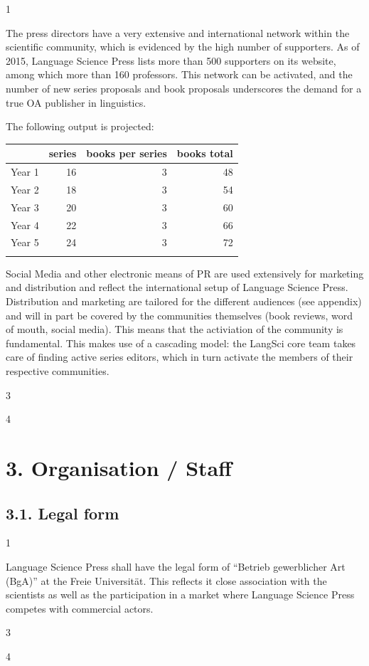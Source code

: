\documentclass[output=guidelines,draftmode]{langscibook}
\newcommand{\background}[1]{ 
  \vspace{5mm}
  \renewcommand{\tblslinecolour}{lsDarkBlue}
  \tblssy[red]{explore2}{Background}{#1}
}
\newcommand{\langscisolution}[1]{
  \renewcommand{\tblslinecolour}{lsLightBlue}
  \tblssy{langsci}{LangSci solution}{#1}
}
\newcommand{\evaluation}[1]{
  \renewcommand{\tblslinecolour}{lsLightOrange}
  \tblssy{receipt}{Evaluation}{#1}
}
\newcommand{\othersolutions}[1]{
  \renewcommand{\tblslinecolour}{lsDarkGreenOne}
  \tblssy{more}{Other solutions}{#1}
}
\renewcommand{\tblssy}[4][black!12]{%
  \renewcommand{\langscisymbol}{#2}\renewcommand{\tblsboxcolor}{#1}
  \begin{mdframed}[style=yellowexercise,frametitle={#3}]
    #4
  \end{mdframed}
}
\begin{document}
\background{1}
\langscisolution{
The press directors have a very extensive and international network within the scientific community, which is evidenced by the high number of supporters. As of 2015, Language Science Press lists more than 500 supporters on its website, among which more than 160 professors. This network can be activated, and the number of new series proposals and book proposals underscores the demand for a true OA publisher in linguistics. 

The following output is projected:

\noindent
\begin{tabularx}{\textwidth}{Xrrr}
\lsptoprule
        & series &  books per series & books total   \\
\midrule         
Year 1 & 16      &  3                & 48              \\
Year 2 & 18      &  3                & 54              \\
Year 3 & 20      &  3                & 60              \\
Year 4 & 22      &  3                & 66              \\
Year 5 & 24      &  3                & 72              \\
\lspbottomrule
\end{tabularx}

Social Media and other electronic means of PR are used extensively for marketing and distribution and reflect the international setup of Language Science Press. Distribution and marketing are tailored for the different audiences (see appendix) and will in part be covered by the communities themselves (book reviews, word of mouth, social media). This means that the activiation of the community is fundamental. This makes use of a cascading model: the LangSci core team takes care of finding active series editors, which in turn activate the members of their respective communities.  
}
\evaluation{3}
\othersolutions{4}

\chapter{3. Organisation / Staff}

\section{3.1. Legal form}

\background{1}
\langscisolution{
Language Science Press shall have the legal form of ``Betrieb gewerblicher Art (BgA)'' at the Freie Universität.
This reflects it close association with the scientists as well as the participation in a market where Language Science Press competes with commercial actors. 
}
\evaluation{3}
\othersolutions{4}
 
\end{document}
